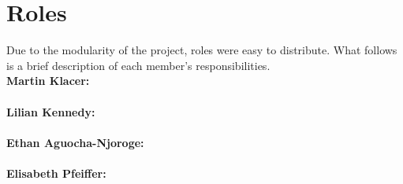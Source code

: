 \section{Roles}
Due to the modularity of the project, roles were easy to distribute. What follows is a brief description of each member's responsibilities. \\ 

\textbf{Martin Klacer:}\\
 \\

\textbf{Lilian Kennedy:}\\
 \\

\textbf{Ethan Aguocha-Njoroge:} \\
\\

\textbf{Elisabeth Pfeiffer:}\\

